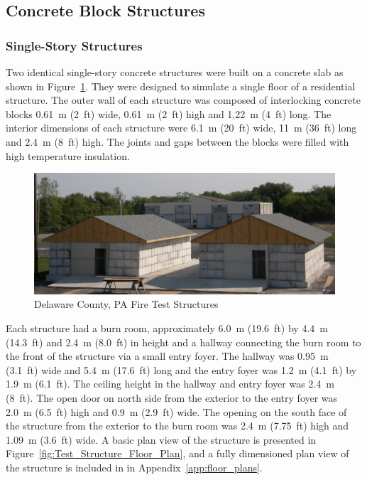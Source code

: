 \documentclass[12pt,oneside]{book}
\begin{document}
\subsection{Concrete Block Structures}
\label{sec:Experimental Structures}
\subsubsection*{Single-Story Structures}

Two identical single-story concrete structures were built on a concrete slab as shown in Figure~\ref{fig:Delaware_County,_PA_Fire_Test_Structures}. They were designed to simulate a single floor of a residential structure.  The outer wall of each structure was composed of interlocking concrete blocks 0.61~m (2~ft) wide, 0.61~m (2~ft) high and 1.22~m (4~ft) long.  The interior dimensions of each structure were 6.1~m (20~ft) wide, 11~m (36~ft) long and 2.4~m (8~ft) high. The joints and gaps between the blocks were filled with high temperature insulation.

\begin{figure}[!ht]
	\includegraphics[width=6in]{../Figures/Pictures/DelCo_Structures}
	\caption{Delaware County, PA Fire Test Structures}
	\label{fig:Delaware_County,_PA_Fire_Test_Structures}
\end{figure}

Each structure had a burn room, approximately 6.0~m (19.6~ft) by 4.4~m (14.3~ft) and 2.4~m (8.0~ft) in height and a hallway connecting the burn room to the front of the structure via a small entry foyer. The hallway was 0.95~m (3.1~ft) wide and 5.4~m (17.6~ft) long and the entry foyer was 1.2~m (4.1~ft) by 1.9~m (6.1~ft). The ceiling height in the hallway and entry foyer was 2.4~m (8~ft).  The open door on north side from the exterior to the entry foyer was 2.0~m (6.5~ft) high and 0.9~m (2.9~ft) wide. The opening on the south face of the structure from the exterior to the burn room was 2.4~m (7.75~ft) high and 1.09~m (3.6~ft) wide. A basic plan view of the structure is presented in Figure~\ref{fig:Test_Structure_Floor_Plan}, and a fully dimensioned plan view of the structure is included in in Appendix~\ref{app:floor_plans}.
\end{document}
